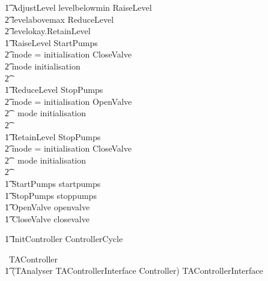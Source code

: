 \documentclass{report} %
\begin{document}
\begin{circusaction}
        \t1 AdjustLevel \circdef  levelbelowmin \then RaiseLevel \extchoice \\ %
            \t2 levelabovemax \then ReduceLevel \extchoice  \\ %
            \t2 levelokay.\true \then RetainLevel \\
        \t1 RaiseLevel \circdef StartPumps \circseq\ \\
            \t2 \circif mode = initialisation \circthen CloseValve \\
            \t2 \circelse mode \neq initialisation \circthen \Skip \\
            \t2 \circfi  \\
        \t1 ReduceLevel \circdef StopPumps \circseq\ \\
            \t2 \circif mode = initialisation \circthen OpenValve \\
            \t2\ \ \circelse mode \neq initialisation \circthen \Skip \\
            \t2 \circfi  \\
        \t1 RetainLevel \circdef StopPumps \circseq\ \\
            \t2 \circif mode = initialisation \circthen CloseValve \\
            \t2\ \ \circelse mode \neq initialisation \circthen \Skip \\
            \t2 \circfi  \\
        \t1 StartPumps \circdef startpumps \then \Skip        \\ %
        \t1 StopPumps \circdef stoppumps \then \Skip         \\ %
        \t1 OpenValve \circdef openvalve \then \Skip         \\ %
        \t1 CloseValve \circdef closevalve \then \Skip \\
\end{circusaction}
\begin{circusaction}
        \t1 \circspot \lschexpract InitController \rschexpract \circseq ControllerCycle \\
\end{circusaction}
\begin{circus}
    \circend
\end{circus}

\begin{circus}
   \circprocess\ TAController \circdef \\
    \t1 (TAnalyser \lpar TAControllerInterface \rpar Controller) \circhide TAControllerInterface
\end{circus}
\end{document}

